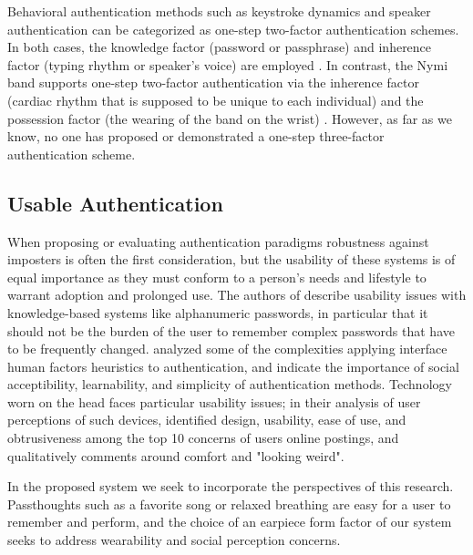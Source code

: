 \documentclass{sigchi}
\begin{document}
Behavioral authentication methods such as keystroke dynamics and speaker authentication can be categorized as one-step two-factor authentication schemes. In both cases, the knowledge factor (password or passphrase) and inherence factor (typing rhythm or speaker's voice) are employed \cite{Monrose1997}. In contrast, the Nymi band supports one-step two-factor authentication via the inherence factor (cardiac rhythm that is supposed to be unique to each individual) and the possession factor (the wearing of the band on the wrist) \cite{Nymi}. However, as far as we know, no one has proposed or demonstrated a one-step three-factor authentication scheme.

\subsection{Usable Authentication}

When proposing or evaluating authentication paradigms robustness against imposters is often the first consideration, but the usability of these systems is of equal importance as they must conform to a person's needs and lifestyle to warrant adoption and prolonged use. The authors of \cite{sasse2001} describe usability issues with knowledge-based systems like alphanumeric passwords, in particular that it should not be the burden of the user to remember complex passwords that have to be frequently changed. \cite{braz2006} analyzed some of the complexities applying interface human factors heuristics to authentication, and indicate the importance of social acceptibility, learnability, and simplicity of authentication methods. Technology worn on the head faces particular usability issues; in their analysis of user perceptions of such devices, \cite{Genaro2014} identified design, usability, ease of use, and obtrusiveness among the top 10 concerns of users online postings, and qualitatively comments around comfort and "looking weird".

In the proposed system we seek to incorporate the perspectives of this research. Passthoughts such as a favorite song or relaxed breathing are easy for a user to remember and perform, and the choice of an earpiece form factor of our system seeks to address wearability and social perception concerns.
\end{document}
